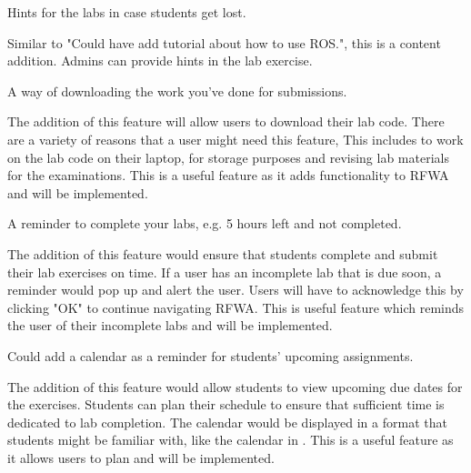 \documentclass{l4proj}
\begin{document}
\begin{center}
    Hints for the labs in case students get lost.
\end{center}

Similar to "Could have add tutorial about how to use ROS.", this is a content addition. Admins can provide hints in the lab exercise.

\begin{center}
     A way of downloading the work you've done for submissions.
\end{center}

The addition of this feature will allow users to download their lab code. There are a variety of reasons that a user might need this feature, This includes to work on the lab code on their laptop, for storage purposes and revising lab materials for the examinations. This is a useful feature as it adds functionality to RFWA and will be implemented.

\begin{center}
    A reminder to complete your labs, e.g. 5 hours left and not completed.
\end{center}

The addition of this feature would ensure that students complete and submit their lab exercises on time. If a user has an incomplete lab that is due soon, a reminder would pop up and alert the user. Users will have to acknowledge this by clicking "OK" to continue navigating RFWA. This is useful feature which reminds the user of their incomplete labs and will be implemented.

\begin{center}
    Could add a calendar as a reminder for students' upcoming assignments.
\end{center}

The addition of this feature would allow students to view upcoming due dates for the exercises. Students can plan their schedule to ensure that sufficient time is dedicated to lab completion. The calendar would be displayed in a format that students might be familiar with, like the calendar in \cite{SoCS}. This is a useful feature as it allows users to plan and will be implemented.
\end{document}
